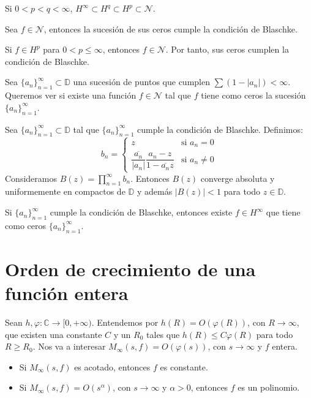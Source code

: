 \begin{theorem}
    Si $0 < p < q < \infty$, $H^\infty \subset H^q \subset H^p \subset \mathcal{N}$.
\end{theorem}


\begin{theorem}
    Sea $f \in \mathcal{N}$, entonces la sucesión de sus ceros cumple la condición de Blaschke.
\end{theorem}


\begin{remark}
    Si $f \in H^p$ para $0 < p \leq \infty$, entonces $f \in \mathcal{N}$.
    Por tanto, sus ceros cumplen la condición de Blaschke.
\end{remark}

Sea $\{a_n\}_{n=1}^\infty \subset \mathbb{D}$ una sucesión de puntos que cumplen $\sum (1-|a_n|) < \infty$.
Queremos ver si existe una función $f \in \mathcal{N}$ tal que $f$ tiene como ceros la sucesión $\{a_n\}_{n=1}^\infty$.

\begin{theorem}
    Sea $\{a_n\}_{n=1}^\infty \subset \mathbb{D}$ tal que $\{a_n\}_{n=1}^\infty$ cumple la condición de Blaschke.
    Definimos:
    $$b_n = \begin{cases}
            z                                                             & \text{si } a_n = 0    \\
            \dfrac{\overline{a_n}}{|a_n|}\dfrac{a_n-z}{1-\overline{a_n}z} & \text{si } a_n \neq 0
        \end{cases}$$
    Consideramos $B(z) = \prod_{n=1}^\infty b_n$.
    Entonces $B(z)$ converge absoluta y uniformemente en compactos de $\mathbb{D}$ y además $|B(z)| < 1$ para todo $z \in \mathbb{D}$.
\end{theorem}


\begin{remark}
    Si $\{a_n\}_{n=1}^\infty$ cumple la condición de Blaschke, entonces existe $f \in H^\infty$ que tiene como ceros $\{a_n\}_{n=1}^\infty$.
\end{remark}

\section{Orden de crecimiento de una función entera}
Sean $h, \varphi: \mathbb{C} \to [0, +\infty)$.
Entendemos por $h(R) = O(\varphi(R))$, con $R \to \infty$, que existen una constante $C$ y un $R_0$ tales que $h(R) \leq C\varphi(R)$ para todo $R \geq R_0$.
Nos va a interesar $M_\infty(s, f) = O(\varphi(s))$, con $s \to \infty$ y $f$ entera.
\begin{itemize}
    \item Si $M_\infty(s, f)$ es acotado, entonces $f$ es constante.
    \item Si $M_\infty(s, f) = O(s^\alpha)$, con $s \to \infty$ y $\alpha > 0$, entonces $f$ es un polinomio.
\end{itemize}

